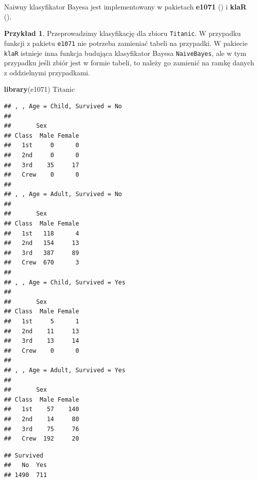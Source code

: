 \documentclass[
]{book}
\newenvironment{Shaded}{\begin{snugshade}}{\end{snugshade}}
\newcommand{\AttributeTok}[1]{\textcolor[rgb]{0.13,0.29,0.53}{#1}}
\newcommand{\FunctionTok}[1]{\textcolor[rgb]{0.13,0.29,0.53}{\textbf{#1}}}
\newcommand{\NormalTok}[1]{#1}
\newcommand{\OtherTok}[1]{\textcolor[rgb]{0.56,0.35,0.01}{#1}}
\newcommand{\SpecialCharTok}[1]{\textcolor[rgb]{0.81,0.36,0.00}{\textbf{#1}}}
\theoremstyle{plain}
\theoremstyle{definition}
\theoremstyle{definition}
\theoremstyle{definition}
\newtheorem{example}{Przykład}[chapter]
\theoremstyle{definition}
\theoremstyle{definition}
\theoremstyle{remark}
\begin{document}
Naiwny klasyfikator Bayesa jest implementowany w pakietach \textbf{e1071} () i \textbf{klaR} ().

\begin{example}
\protect\hypertarget{exm:unnamed-chunk-74}{}\label{exm:unnamed-chunk-74}Przeprowadzimy klasyfikację dla zbioru \texttt{Titanic}. W przypadku funkcji z pakietu \texttt{e1071} nie potrzeba zamieniać tabeli na przypadki. W pakiecie \texttt{klaR} istnieje inna funkcja budująca klasyfikator Bayesa \texttt{NaiveBayes}, ale w tym przypadku jeśli zbiór jest w formie tabeli, to należy go zamienić na ramkę danych z oddzielnymi przypadkami.
\end{example}

\begin{Shaded}
\begin{Highlighting}[]
\FunctionTok{library}\NormalTok{(e1071)}
\NormalTok{Titanic}
\end{Highlighting}
\end{Shaded}

\begin{verbatim}
## , , Age = Child, Survived = No
## 
##       Sex
## Class  Male Female
##   1st     0      0
##   2nd     0      0
##   3rd    35     17
##   Crew    0      0
## 
## , , Age = Adult, Survived = No
## 
##       Sex
## Class  Male Female
##   1st   118      4
##   2nd   154     13
##   3rd   387     89
##   Crew  670      3
## 
## , , Age = Child, Survived = Yes
## 
##       Sex
## Class  Male Female
##   1st     5      1
##   2nd    11     13
##   3rd    13     14
##   Crew    0      0
## 
## , , Age = Adult, Survived = Yes
## 
##       Sex
## Class  Male Female
##   1st    57    140
##   2nd    14     80
##   3rd    75     76
##   Crew  192     20
\end{verbatim}

\begin{Shaded}
\end{Shaded}

\begin{verbatim}
## Survived
##   No  Yes 
## 1490  711
\end{verbatim}
\end{document}
